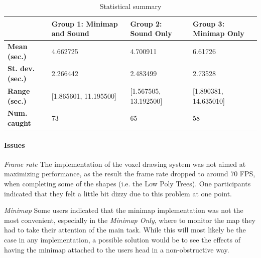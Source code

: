 	

\begin{table}[h]
	\label{tab:final_study_stats}
	\caption{Statistical summary}
	
	\begin{tabular}{|l|l|l|l|}
		\hline
		& \textbf{Group 1: Minimap and Sound} & \textbf{Group 2: Sound Only} & \textbf{Group 3: Minimap Only} \\ \hline
		\textbf{Mean (sec.)}  & 4.662725                            & 4.700911                     & 6.61726                        \\ \hline
		\textbf{St. dev. (sec.)}  & 2.266442                            & 2.483499                     & 2.73528                        \\ \hline
		\textbf{Range (sec.)} & {[}1.865601, 11.195500{]}           & {[}1.567505, 13.192500{]}    & {[}1.890381, 14.635010{]}      \\ \hline
		\textbf{Num. caught}  & 73                                  & 65                           & 58                             \\ \hline
	\end{tabular}
\end{table}

\paragraph{Issues} \hfill
\textit{Frame rate} The implementation of the voxel drawing system was not aimed at maximizing performance, as the result the frame rate dropped to around 70 FPS, when completing some of the shapes (i.e. the Low Poly Trees). One participants indicated that they felt a little bit dizzy due to this problem at one point.

\textit{Minimap} Some users indicated that the minimap implementation was not the most convenient, especially in the \textit{Minimap Only}, where to monitor the map they had to take their attention of the main task. While this will most likely be the case in any implementation, a possible solution would be to see the effects of having the minimap attached to the users head in a non-obstructive way.

